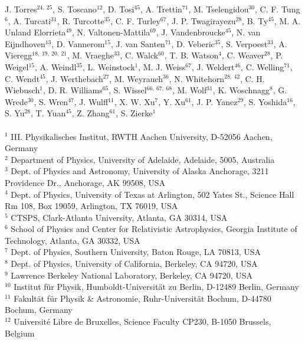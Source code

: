 \documentclass[a4paper,11pt]{article}
\begin{document}
J. Torres$^{24,\: 25}$,
S. Toscano$^{12}$,
D. Tosi$^{45}$,
A. Trettin$^{71}$,
M. Tselengidou$^{30}$,
C. F. Tung$^{6}$,
A. Turcati$^{31}$,
R. Turcotte$^{35}$,
C. F. Turley$^{67}$,
J. P. Twagirayezu$^{28}$,
B. Ty$^{45}$,
M. A. Unland Elorrieta$^{49}$,
N. Valtonen-Mattila$^{69}$,
J. Vandenbroucke$^{45}$,
N. van Eijndhoven$^{13}$,
D. Vannerom$^{15}$,
J. van Santen$^{71}$,
D. Veberic$^{35}$,
S. Verpoest$^{33}$,
A. Vieregg$^{18,\: 19,\: 20,\: 21}$,
M. Vraeghe$^{33}$,
C. Walck$^{60}$,
T. B. Watson$^{4}$,
C. Weaver$^{28}$,
P. Weigel$^{15}$,
A. Weindl$^{35}$,
L. Weinstock$^{1}$,
M. J. Weiss$^{67}$,
J. Weldert$^{46}$,
C. Welling$^{71}$,
C. Wendt$^{45}$,
J. Werthebach$^{27}$,
M. Weyrauch$^{36}$,
N. Whitehorn$^{28,\: 42}$,
C. H. Wiebusch$^{1}$,
D. R. Williams$^{65}$,
S. Wissel$^{66,\: 67,\: 68}$,
M. Wolf$^{31}$,
K. Woschnagg$^{8}$,
G. Wrede$^{30}$,
S. Wren$^{47}$,
J. Wulff$^{11}$,
X. W. Xu$^{7}$,
Y. Xu$^{61}$,
J. P. Yanez$^{29}$,
S. Yoshida$^{16}$,
S. Yu$^{28}$,
T. Yuan$^{45}$,
Z. Zhang$^{61}$,
S. Zierke$^{1}$
\\
\\
$^{1}$ III. Physikalisches Institut, RWTH Aachen University, D-52056 Aachen, Germany \\
$^{2}$ Department of Physics, University of Adelaide, Adelaide, 5005, Australia \\
$^{3}$ Dept. of Physics and Astronomy, University of Alaska Anchorage, 3211 Providence Dr., Anchorage, AK 99508, USA \\
$^{4}$ Dept. of Physics, University of Texas at Arlington, 502 Yates St., Science Hall Rm 108, Box 19059, Arlington, TX 76019, USA \\
$^{5}$ CTSPS, Clark-Atlanta University, Atlanta, GA 30314, USA \\
$^{6}$ School of Physics and Center for Relativistic Astrophysics, Georgia Institute of Technology, Atlanta, GA 30332, USA \\
$^{7}$ Dept. of Physics, Southern University, Baton Rouge, LA 70813, USA \\
$^{8}$ Dept. of Physics, University of California, Berkeley, CA 94720, USA \\
$^{9}$ Lawrence Berkeley National Laboratory, Berkeley, CA 94720, USA \\
$^{10}$ Institut f{\"u}r Physik, Humboldt-Universit{\"a}t zu Berlin, D-12489 Berlin, Germany \\
$^{11}$ Fakult{\"a}t f{\"u}r Physik {\&} Astronomie, Ruhr-Universit{\"a}t Bochum, D-44780 Bochum, Germany \\
$^{12}$ Universit{\'e} Libre de Bruxelles, Science Faculty CP230, B-1050 Brussels, Belgium \\
\end{document}
